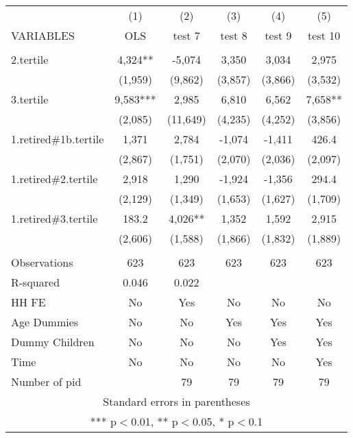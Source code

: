 \begin{tabular}{lccccc} \hline
 & (1) & (2) & (3) & (4) & (5) \\
VARIABLES & OLS & test 7 & test 8 & test 9 & test 10 \\ \hline
 &  &  &  &  &  \\
2.tertile & 4,324** & -5,074 & 3,350 & 3,034 & 2,975 \\
 & (1,959) & (9,862) & (3,857) & (3,866) & (3,532) \\
3.tertile & 9,583*** & 2,985 & 6,810 & 6,562 & 7,658** \\
 & (2,085) & (11,649) & (4,235) & (4,252) & (3,856) \\
1.retired\#1b.tertile & 1,371 & 2,784 & -1,074 & -1,411 & 426.4 \\
 & (2,867) & (1,751) & (2,070) & (2,036) & (2,097) \\
1.retired\#2.tertile & 2,918 & 1,290 & -1,924 & -1,356 & 294.4 \\
 & (2,129) & (1,349) & (1,653) & (1,627) & (1,709) \\
1.retired\#3.tertile & 183.2 & 4,026** & 1,352 & 1,592 & 2,915 \\
 & (2,606) & (1,588) & (1,866) & (1,832) & (1,889) \\
 &  &  &  &  &  \\
Observations & 623 & 623 & 623 & 623 & 623 \\
R-squared & 0.046 & 0.022 &  &  &  \\
HH FE & No & Yes & No & No & No \\
Age Dummies & No & No & Yes & Yes & Yes \\
Dummy Children & No & No & No & Yes & Yes \\
Time & No & No & No & No & Yes \\
 Number of pid &  & 79 & 79 & 79 & 79 \\ \hline
\multicolumn{6}{c}{ Standard errors in parentheses} \\
\multicolumn{6}{c}{ *** p$<$0.01, ** p$<$0.05, * p$<$0.1} \\
\end{tabular}
